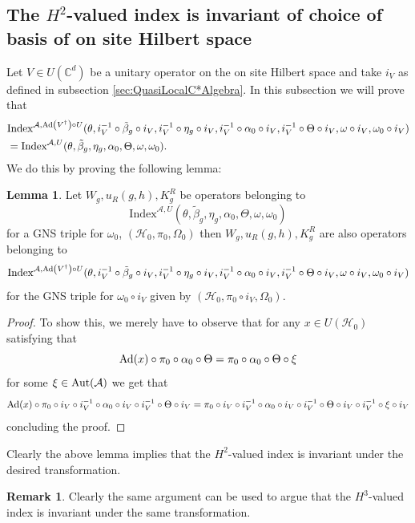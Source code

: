 \documentclass[12pt,a4paper,twoside]{article}
\let\originalleft\left
\let\originalright\right
\renewcommand{\left}{\mathopen{}\mathclose\bgroup\originalleft}
\renewcommand{\right}{\aftergroup\egroup\originalright}
\newcommand{\HH}{\mathcal H}
\newcommand{\CC}{\mathbb C}
\renewcommand{\AA}{\mathcal A}
\newcommand{\Ad}[1]{\textrm{Ad}\left(#1\right)}
\newcommand{\Aut}[1]{\textrm{Aut}\left(#1\right)}
\theoremstyle{definition}
\newtheorem{lemma}[theorem]{Lemma}
\newtheorem{remark}[theorem]{Remark}
\numberwithin{equation}{section}
\begin{document}
\subsection{The $H^2$-valued index is invariant of choice of basis of on site Hilbert space}\label{sec:the-h2-valued-index-is-invariant-of-choice-of-basis-of-on-site-hilbert-space}
Let $V \in U(\CC^d)$ be a unitary operator on the on site Hilbert space and take $i_V$ as defined in subsection \ref{sec:QuasiLocalC*Algebra}. In this subsection we will prove that
\begin{align}
	&\textrm{Index}^{\AA,\Ad{V^\dagger}\circ U}(\theta,i_V^{-1}\circ\tilde{\beta}_g\circ i_V,i_V^{-1}\circ\eta_g\circ i_V,i_V^{-1}\circ\alpha_0\circ i_V,i_V^{-1}\circ\Theta\circ i_V,\omega\circ i_V,\omega_0\circ i_V)\\
	&=\textrm{Index}^{\AA,U}(\theta,\tilde{\beta}_g,\eta_g,\alpha_0,\Theta,\omega,\omega_0).
\end{align}
We do this by proving the following lemma:
\begin{lemma}
	Let $W_g,u_R(g,h),K^R_g$ be operators belonging to
	\begin{equation}
		\textrm{Index}^{\AA,U}(\theta,\tilde{\beta}_g,\eta_g,\alpha_0,\Theta,\omega,\omega_0)
	\end{equation}
	for a GNS triple for $\omega_0$, $(\HH_0,\pi_0,\Omega_0)$ then $W_g,u_R(g,h),K^R_g$ are also operators belonging to
	\begin{equation}
		\textrm{Index}^{\AA,\Ad{V^\dagger}\circ U}(\theta,i_V^{-1}\circ\tilde{\beta}_g\circ i_V,i_V^{-1}\circ\eta_g\circ i_V,i_V^{-1}\circ\alpha_0\circ i_V,i_V^{-1}\circ\Theta\circ i_V,\omega\circ i_V,\omega_0\circ i_V)
	\end{equation}
	for the GNS triple for $\omega_0\circ i_V$ given by $(\HH_0,\pi_0\circ i_V,\Omega_0)$.
\end{lemma}
\begin{proof}
	To show this, we merely have to observe that for any $x\in U(\HH_0)$ satisfying that
	\begin{equation}
		\Ad{x}\circ\pi_0\circ\alpha_0\circ\Theta =\pi_0\circ\alpha_0\circ\Theta\circ\xi
	\end{equation}
	for some $\xi\in\Aut{\AA}$ we get that
	\begin{equation}
		\Ad{x}\circ\pi_0\circ i_V\circ i_V^{-1}\circ\alpha_0\circ i_V\circ i_V^{-1}\circ\Theta\circ i_V =\pi_0\circ i_V\circ i_V^{-1}\circ\alpha_0\circ i_V\circ i_V^{-1}\circ\Theta\circ i_V\circ i_V^{-1}\circ\xi\circ i_V
	\end{equation}
	concluding the proof.
\end{proof}
Clearly the above lemma implies that the $H^2$-valued index is invariant under the desired transformation.
\begin{remark}\label{rem:OnSiteUnitaryTransformationH3ValuedIndex}
	Clearly the same argument can be used to argue that the $H^3$-valued index is invariant under the same transformation.
\end{remark}
\end{document}
